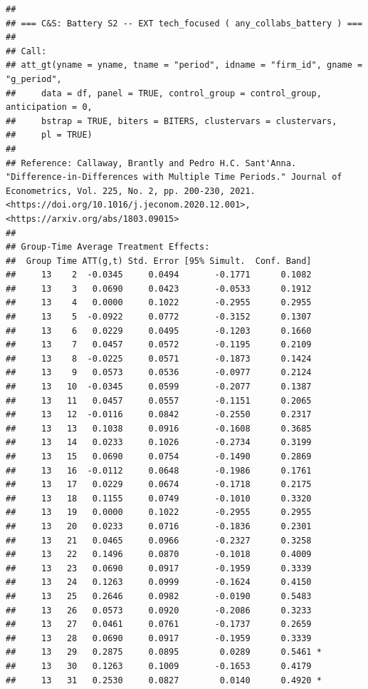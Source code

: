 \documentclass[
]{article}
\begin{document}
\begin{verbatim}
## 
## === C&S: Battery S2 -- EXT tech_focused ( any_collabs_battery ) ===
## 
## Call:
## att_gt(yname = yname, tname = "period", idname = "firm_id", gname = "g_period", 
##     data = df, panel = TRUE, control_group = control_group, anticipation = 0, 
##     bstrap = TRUE, biters = BITERS, clustervars = clustervars, 
##     pl = TRUE)
## 
## Reference: Callaway, Brantly and Pedro H.C. Sant'Anna.  "Difference-in-Differences with Multiple Time Periods." Journal of Econometrics, Vol. 225, No. 2, pp. 200-230, 2021. <https://doi.org/10.1016/j.jeconom.2020.12.001>, <https://arxiv.org/abs/1803.09015> 
## 
## Group-Time Average Treatment Effects:
##  Group Time ATT(g,t) Std. Error [95% Simult.  Conf. Band]  
##     13    2  -0.0345     0.0494       -0.1771      0.1082  
##     13    3   0.0690     0.0423       -0.0533      0.1912  
##     13    4   0.0000     0.1022       -0.2955      0.2955  
##     13    5  -0.0922     0.0772       -0.3152      0.1307  
##     13    6   0.0229     0.0495       -0.1203      0.1660  
##     13    7   0.0457     0.0572       -0.1195      0.2109  
##     13    8  -0.0225     0.0571       -0.1873      0.1424  
##     13    9   0.0573     0.0536       -0.0977      0.2124  
##     13   10  -0.0345     0.0599       -0.2077      0.1387  
##     13   11   0.0457     0.0557       -0.1151      0.2065  
##     13   12  -0.0116     0.0842       -0.2550      0.2317  
##     13   13   0.1038     0.0916       -0.1608      0.3685  
##     13   14   0.0233     0.1026       -0.2734      0.3199  
##     13   15   0.0690     0.0754       -0.1490      0.2869  
##     13   16  -0.0112     0.0648       -0.1986      0.1761  
##     13   17   0.0229     0.0674       -0.1718      0.2175  
##     13   18   0.1155     0.0749       -0.1010      0.3320  
##     13   19   0.0000     0.1022       -0.2955      0.2955  
##     13   20   0.0233     0.0716       -0.1836      0.2301  
##     13   21   0.0465     0.0966       -0.2327      0.3258  
##     13   22   0.1496     0.0870       -0.1018      0.4009  
##     13   23   0.0690     0.0917       -0.1959      0.3339  
##     13   24   0.1263     0.0999       -0.1624      0.4150  
##     13   25   0.2646     0.0982       -0.0190      0.5483  
##     13   26   0.0573     0.0920       -0.2086      0.3233  
##     13   27   0.0461     0.0761       -0.1737      0.2659  
##     13   28   0.0690     0.0917       -0.1959      0.3339  
##     13   29   0.2875     0.0895        0.0289      0.5461 *
##     13   30   0.1263     0.1009       -0.1653      0.4179  
##     13   31   0.2530     0.0827        0.0140      0.4920 *

\end{verbatim}
\end{document}
